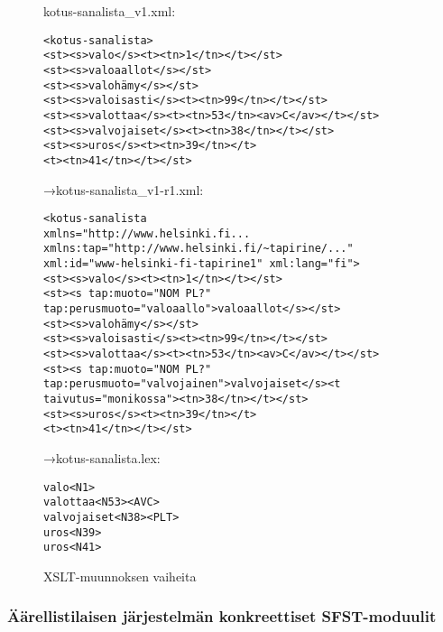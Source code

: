 \documentclass[free]{flammie}
\begin{document}
\begin{figure}
    \caption{XSLT-muunnoksen vaiheita \label{kuva:x}}

kotus-sanalista\_v1.xml:\\
    \begin{verbatim}
<kotus-sanalista>
<st><s>valo</s><t><tn>1</tn></t></st>
<st><s>valoaallot</s></st>
<st><s>valohämy</s></st>
<st><s>valoisasti</s><t><tn>99</tn></t></st>
<st><s>valottaa</s><t><tn>53</tn><av>C</av></t></st>
<st><s>valvojaiset</s><t><tn>38</tn></t></st>
<st><s>uros</s><t><tn>39</tn></t>
<t><tn>41</tn></t></st>
    \end{verbatim}
→kotus-sanalista\_v1-r1.xml:\\
    \begin{verbatim}
<kotus-sanalista
xmlns="http://www.helsinki.fi...
xmlns:tap="http://www.helsinki.fi/~tapirine/..."
xml:id="www-helsinki-fi-tapirine1" xml:lang="fi">
<st><s>valo</s><t><tn>1</tn></t></st>
<st><s tap:muoto="NOM PL?"
tap:perusmuoto="valoaallo">valoaallot</s></st>
<st><s>valohämy</s></st>
<st><s>valoisasti</s><t><tn>99</tn></t></st>
<st><s>valottaa</s><t><tn>53</tn><av>C</av></t></st>
<st><s tap:muoto="NOM PL?"
tap:perusmuoto="valvojainen">valvojaiset</s><t
taivutus="monikossa"><tn>38</tn></t></st>
<st><s>uros</s><t><tn>39</tn></t>
<t><tn>41</tn></t></st>
    \end{verbatim}
→kotus-sanalista.lex:\\
    \begin{verbatim}
valo<N1>
valottaa<N53><AVC>
valvojaiset<N38><PLT>
uros<N39>
uros<N41>
    \end{verbatim}
\end{figure}

\subsubsection{Äärellistilaisen järjestelmän konkreettiset SFST-moduulit}
\end{document}
